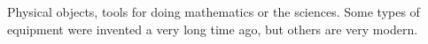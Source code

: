 Physical objects, tools for doing mathematics or the sciences. Some types of
equipment were invented a very long time ago, but others are very modern.